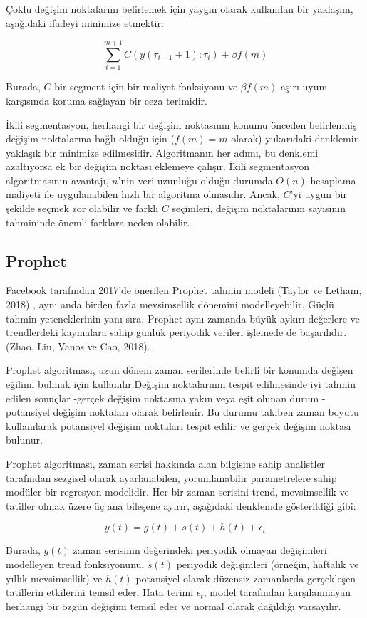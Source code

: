 \documentclass[12pt,twoside]{deuthesis}
\begin{document}
Çoklu değişim noktalarını belirlemek için yaygın olarak kullanılan bir yaklaşım, aşağıdaki ifadeyi minimize etmektir:

\[\sum_{i=1}^{m+1} C(y(\tau_{i-1}+1):\tau_i) + \beta f(m)\]

Burada, \(C\) bir segment için bir maliyet fonksiyonu ve \(\beta f(m)\) aşırı uyum karşısında koruma sağlayan bir ceza terimidir.

İkili segmentasyon, herhangi bir değişim noktasının konumu önceden belirlenmiş değişim noktalarına bağlı olduğu için (\(f(m) = m\) olarak) yukarıdaki denklemin yaklaşık bir minimize edilmesidir. Algoritmanın her adımı, bu denklemi azaltıyorsa ek bir değişim noktası eklemeye çalışır. İkili segmentasyon algoritmasının avantajı, \(n\)'nin veri uzunluğu olduğu durumda \(O(n)\) hesaplama maliyeti ile uygulanabilen hızlı bir algoritma olmasıdır. Ancak, \(C\)'yi uygun bir şekilde seçmek zor olabilir ve farklı \(C\) seçimleri, değişim noktalarının sayısının tahmininde önemli farklara neden olabilir.

\subsection{Prophet}\label{prophet}

Facebook tarafından 2017'de önerilen Prophet tahmin modeli (Taylor ve Letham, 2018) , aynı anda birden fazla mevsimsellik dönemini modelleyebilir. Güçlü tahmin yeteneklerinin yanı sıra, Prophet aynı zamanda büyük aykırı değerlere ve trendlerdeki kaymalara sahip günlük periyodik verileri işlemede de başarılıdır.(Zhao, Liu, Vanos ve Cao, 2018).

Prophet algoritması, uzun dönem zaman serilerinde belirli bir konumda değişen eğilimi bulmak için kullanılır.Değişim noktalarının tespit edilmesinde iyi tahmin edilen sonuçlar -gerçek değişim noktasına yakın veya eşit olunan durum - potansiyel değişim noktaları olarak belirlenir. Bu durumu takiben zaman boyutu kullanılarak potansiyel değişim noktaları tespit edilir ve gerçek değişim noktası bulunur.

Prophet algoritması, zaman serisi hakkında alan bilgisine sahip analistler tarafından sezgisel olarak ayarlanabilen, yorumlanabilir parametrelere sahip modüler bir regresyon modelidir. Her bir zaman serisini trend, mevsimsellik ve tatiller olmak üzere üç ana bileşene ayırır, aşağıdaki denklemde gösterildiği gibi:

\[ y(t) = g(t) + s(t) + h(t) + \epsilon_t \]

Burada, \(g(t)\) zaman serisinin değerindeki periyodik olmayan değişimleri modelleyen trend fonksiyonunu, \(s(t)\) periyodik değişimleri (örneğin, haftalık ve yıllık mevsimsellik) ve \(h(t)\) potansiyel olarak düzensiz zamanlarda gerçekleşen tatillerin etkilerini temsil eder. Hata terimi \(\epsilon_t\), model tarafından karşılanmayan herhangi bir özgün değişimi temsil eder ve normal olarak dağıldığı varsayılır.
\end{document}
